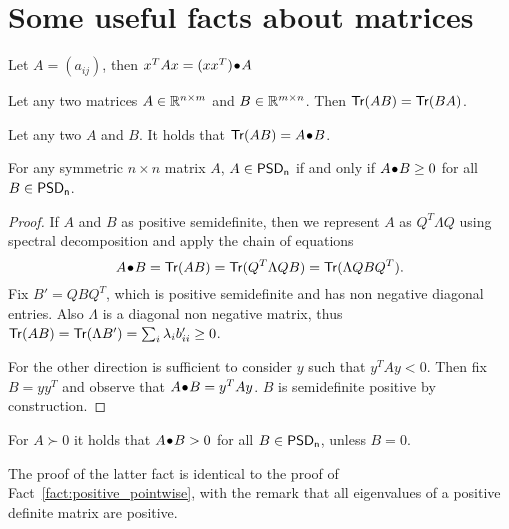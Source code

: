 \documentclass[a4paper,twoside,justified]{tufte-handout}
\begin{document}
\section{Some useful facts about matrices}

\begin{fact}
  Let $ A=(a_{ij}) $, then $x^{T}A x = {(xx^{T})}\!\bullet\!{A}$
\end{fact}

\begin{fact}
  Let any two matrices $ A \in\mathbb{R}^{n\times m}$ and $ B \in\mathbb{R}^{m\times
    n} $. Then $ \mathsf{Tr}(AB)= \mathsf{Tr}(BA)$.
\end{fact}

\begin{fact}
  Let any two  $ A $ and $ B $. It holds that
  $ \mathsf{Tr}(AB)={A}\!\bullet\!{B} $.
\end{fact}

\begin{fact}\label{fact:positive_pointwise}
  For any symmetric $ n \times n $ matrix $ A $, $ A \in
  \mathsf{PSD_{n}} $ if and only if $ {A}\!\bullet\!{B}\geq 0
  $ for all $ B \in \mathsf{PSD_{n}} $.
\end{fact}
\begin{proof}
  If $ A $ and $ B $ as positive semidefinite, then we represent $ A $
  as $Q^{T}\Lambda Q$ using spectral decomposition and apply the chain
  of equations
  \begin{equation}
    {A}\!\bullet\!{B}=\mathsf{Tr}(AB)=\mathsf{Tr}(Q^{T}\Lambda Q B)
    =\mathsf{Tr}(\Lambda Q B Q^{T}). 
  \end{equation}
  Fix $ B' = Q B Q^{T} $, which is positive semidefinite and has non
  negative diagonal entries. Also $ \Lambda $ is a diagonal
  non negative matrix, thus $
  \mathsf{Tr}(AB)=\mathsf{Tr}(\Lambda B')=\sum_{i}\lambda_{i}b'_{ii} \geq 0$. 

  For the other direction is sufficient to consider $ y$ such that $
  y^{T}Ay <0$. Then fix $ B=yy^{T} $ and observe that $
  {A}\!\bullet\!{B}=y^{T}Ay$. $ B $ is semidefinite positive by
  construction.
\end{proof}

\begin{fact}\label{fact:strict_positive_pointwise}
  For $ A \succ 0 $ it holds that $ {A}\!\bullet\!{B}>0 $ for all $
  B \in \mathsf{PSD_{n}} $, unless $ B=0 $.
\end{fact}
The proof of the latter fact is identical to the proof of
Fact~\ref{fact:positive_pointwise}, with the remark that all
eigenvalues of a positive definite matrix are positive.
\end{document}
